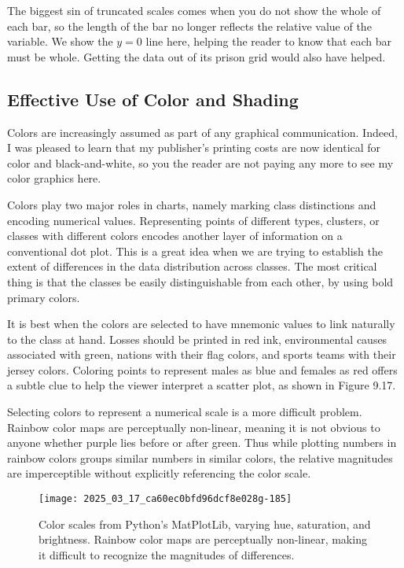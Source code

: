\documentclass[10pt]{article}
\begin{document}
The biggest sin of truncated scales comes when you do not show the whole of each bar, so the length of the bar no longer reflects the relative value of the variable. We show the $y = 0$ line here, helping the reader to know that each bar must be whole. Getting the data out of its prison grid would also have helped.

\subsection{Effective Use of Color and Shading}
Colors are increasingly assumed as part of any graphical communication. Indeed, I was pleased to learn that my publisher's printing costs are now identical for color and black-and-white, so you the reader are not paying any more to see my color graphics here.

Colors play two major roles in charts, namely marking class distinctions and encoding numerical values. Representing points of different types, clusters, or classes with different colors encodes another layer of information on a conventional dot plot. This is a great idea when we are trying to establish the extent of differences in the data distribution across classes. The most critical thing is that the classes be easily distinguishable from each other, by using bold primary colors.

It is best when the colors are selected to have mnemonic values to link naturally to the class at hand. Losses should be printed in red ink, environmental causes associated with green, nations with their flag colors, and sports teams with their jersey colors. Coloring points to represent males as blue and females as red offers a subtle clue to help the viewer interpret a scatter plot, as shown in Figure 9.17.

Selecting colors to represent a numerical scale is a more difficult problem. Rainbow color maps are perceptually non-linear, meaning it is not obvious to anyone whether purple lies before or after green. Thus while plotting numbers in rainbow colors groups similar numbers in similar colors, the relative magnitudes are imperceptible without explicitly referencing the color scale.

\begin{figure}[h]
    \centering
    \texttt{[image: 2025\_03\_17\_ca60ec0bfd96dcf8e028g-185]}
    \caption{Color scales from Python's MatPlotLib, varying hue, saturation, and brightness. Rainbow color maps are perceptually non-linear, making it difficult to recognize the magnitudes of differences.}
\end{figure}
\end{document}
